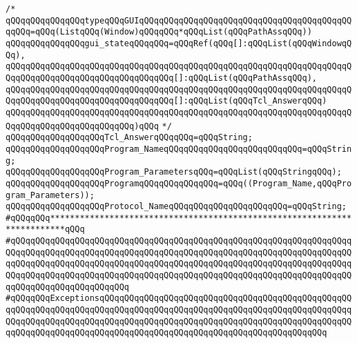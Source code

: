\newline
\verb|/*|\newline
\verb|qQQqqQQqqQQqqQQqtypeqQQqGUIqQQqqQQqqQQqqQQqqQQqqQQqqQQqqQQqqQQqqQQqqQQqqQQq=qQQq(ListqQQq(Window)qQQqqQQq*qQQqList(qQQqPathAssqQQq))|\newline
\newline
\newline
\verb|qQQqqQQqqQQqqQQqgui_stateqQQqqQQq=qQQqRef(qQQq[]:qQQqList(qQQqWindowqQQq),|\newline
\verb|qQQqqQQqqQQqqQQqqQQqqQQqqQQqqQQqqQQqqQQqqQQqqQQqqQQqqQQqqQQqqQQqqQQqqQQqqQQqqQQqqQQqqQQqqQQqqQQqqQQqqQQq[]:qQQqList(qQQqPathAssqQQq),|\newline
\verb|qQQqqQQqqQQqqQQqqQQqqQQqqQQqqQQqqQQqqQQqqQQqqQQqqQQqqQQqqQQqqQQqqQQqqQQqqQQqqQQqqQQqqQQqqQQqqQQqqQQqqQQq[]:qQQqList(qQQqTcl_AnswerqQQq)|\newline
\verb|qQQqqQQqqQQqqQQqqQQqqQQqqQQqqQQqqQQqqQQqqQQqqQQqqQQqqQQqqQQqqQQqqQQqqQQqqQQqqQQqqQQqqQQqqQQqqQQq)qQQq|\newline
\verb|*/|\newline
\newline
\verb|qQQqqQQqqQQqqQQqqQQqTcl_AnswerqQQqqQQq=qQQqString;|\newline
\newline
\verb|qQQqqQQqqQQqqQQqqQQqProgram_NameqQQqqQQqqQQqqQQqqQQqqQQqqQQq=qQQqString;|\newline
\verb|qQQqqQQqqQQqqQQqqQQqProgram_ParametersqQQq=qQQqList(qQQqStringqQQq);|\newline
\verb|qQQqqQQqqQQqqQQqqQQqProgramqQQqqQQqqQQqqQQq=qQQq((Program_Name,qQQqProgram_Parameters));|\newline
\verb|qQQqqQQqqQQqqQQqqQQqProtocol_NameqQQqqQQqqQQqqQQqqQQqqQQq=qQQqString;|\newline
\newline
\newline
\newline
\verb|#qQQqqQQq*************************************************************************qQQq|\newline
\verb|#qQQqqQQqqQQqqQQqqQQqqQQqqQQqqQQqqQQqqQQqqQQqqQQqqQQqqQQqqQQqqQQqqQQqqQQqqQQqqQQqqQQqqQQqqQQqqQQqqQQqqQQqqQQqqQQqqQQqqQQqqQQqqQQqqQQqqQQqqQQqqQQqqQQqqQQqqQQqqQQqqQQqqQQqqQQqqQQqqQQqqQQqqQQqqQQqqQQqqQQqqQQqqQQqqQQqqQQqqQQqqQQqqQQqqQQqqQQqqQQqqQQqqQQqqQQqqQQqqQQqqQQqqQQqqQQqqQQqqQQqqQQqqQQqqQQqqQQqqQQqqQQq|\newline
\verb|#qQQqqQQqExceptionsqQQqqQQqqQQqqQQqqQQqqQQqqQQqqQQqqQQqqQQqqQQqqQQqqQQqqQQqqQQqqQQqqQQqqQQqqQQqqQQqqQQqqQQqqQQqqQQqqQQqqQQqqQQqqQQqqQQqqQQqqQQqqQQqqQQqqQQqqQQqqQQqqQQqqQQqqQQqqQQqqQQqqQQqqQQqqQQqqQQqqQQqqQQqqQQqqQQqqQQqqQQqqQQqqQQqqQQqqQQqqQQqqQQqqQQqqQQqqQQqqQQqqQQqqQQqqQQq|\newline

